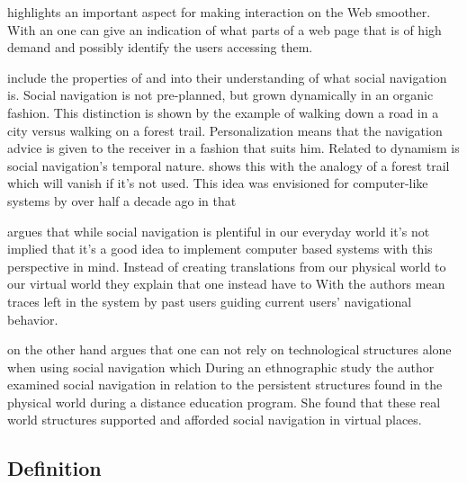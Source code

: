 \citeauthor{dieberger97} highlights an important aspect for making interaction
on the Web smoother. With an
one can give an indication of what parts of a web page that is of high demand
and possibly identify the users accessing them.

\citet[]{dieberger00b} include the properties of 
and  into their understanding of what social navigation is.
Social navigation is not pre-planned, but grown dynamically in an organic
fashion. This distinction is shown by the example of walking down a road in a
city versus walking on a forest trail. Personalization means that the
navigation advice is given to the receiver in a fashion that suits him.
Related to dynamism is social navigation's temporal nature.
\citet[]{dieberger00b} shows this with the analogy of a forest trail
which will vanish if it's not used. This idea was envisioned for computer-like
systems by \citeauthor{bush45} over half a decade ago in that

\citet{svensson05} argues that while social navigation is plentiful in
our everyday world it's not implied that it's a good idea to implement
computer based systems with this perspective in mind. Instead of creating
translations from our physical world to our virtual world
they explain that one instead have to
With  the authors mean traces left in the system by past
users guiding current users' navigational behavior.

\citeauthor{robins02} on the other hand argues that one can not rely on
technological structures alone when using social navigation which
During an ethnographic study the author examined social navigation in relation
to the persistent structures found in the physical world during a distance
education program. She found that these real world structures supported and
afforded social navigation in virtual places.

\subsection{Definition}

